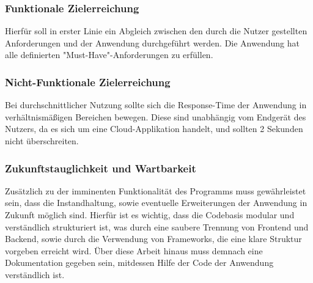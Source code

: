 \subsubsection{Funktionale Zielerreichung}
Hierfür soll in erster Linie ein Abgleich zwischen den durch die Nutzer gestellten Anforderungen und der Anwendung durchgeführt werden. Die Anwendung hat
alle definierten "Must-Have"-Anforderungen zu erfüllen. 
\subsubsection{Nicht-Funktionale Zielerreichung}
Bei durchschnittlicher Nutzung sollte sich die Response-Time der Anwendung in verhältnismäßigen Bereichen bewegen. Diese sind unabhängig vom Endgerät des Nutzers, da es
sich um eine Cloud-Applikation handelt, und sollten 2 Sekunden nicht überschreiten.
\subsubsection{Zukunftstauglichkeit und Wartbarkeit}
Zusätzlich zu der imminenten Funktionalität des Programms muss gewährleistet sein, dass die Instandhaltung, sowie eventuelle Erweiterungen der Anwendung in Zukunft möglich sind.
Hierfür ist es wichtig, dass die Codebasis modular und verständlich strukturiert ist, was durch eine saubere Trennung von Frontend und Backend, sowie durch die Verwendung von Frameworks, die eine klare Struktur vorgeben erreicht wird.
Über diese Arbeit hinaus muss demnach eine Dokumentation gegeben sein, mitdessen Hilfe der Code der Anwendung verständlich ist.


